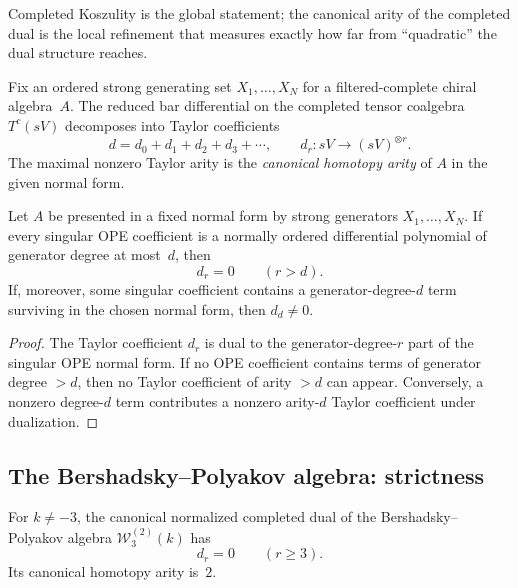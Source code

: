 Completed Koszulity is the global statement; the canonical arity of
the completed dual is the local refinement that measures exactly how
far from ``quadratic'' the dual structure reaches.

\begin{definition}
\label{def:w-canonical-homotopy-arity}
Fix an ordered strong generating set
$X_1, \dots, X_N$ for a filtered-complete chiral algebra~$A$.  The
reduced bar differential on the completed tensor coalgebra
$T^c(sV)$ decomposes into Taylor coefficients
\[
d = d_0 + d_1 + d_2 + d_3 + \cdots, \qquad
d_r \colon sV \to (sV)^{\otimes r}.
\]
The maximal nonzero Taylor arity is the \emph{canonical homotopy
arity} of $A$ in the given normal form.
\end{definition}

\begin{theorem}
\label{thm:w-canonical-arity-detection}
Let $A$ be presented in a fixed normal form by strong generators
$X_1, \dots, X_N$.  If every singular OPE coefficient is a normally
ordered differential polynomial of generator degree at most~$d$, then
\[
d_r = 0 \qquad (r > d).
\]
If, moreover, some singular coefficient contains a
generator-degree-$d$ term surviving in the chosen normal form, then
$d_d \neq 0$.
\end{theorem}

\begin{proof}
The Taylor coefficient $d_r$ is dual to the generator-degree-$r$
part of the singular OPE normal form.  If no OPE coefficient contains
terms of generator degree $> d$, then no Taylor coefficient of arity
$> d$ can appear.  Conversely, a nonzero degree-$d$ term contributes
a nonzero arity-$d$ Taylor coefficient under dualization.
\end{proof}

\subsection{The Bershadsky--Polyakov algebra: strictness}
\label{subsec:bershadsky-polyakov-strict}

\begin{theorem}
\label{thm:w-bp-strict}
For $k \neq -3$, the canonical normalized completed dual of the
Bershadsky--Polyakov algebra $\mathcal{W}_3^{(2)}(k)$ has
\[
d_r = 0 \qquad (r \ge 3).
\]
Its canonical homotopy arity is~$2$.
\end{theorem}

